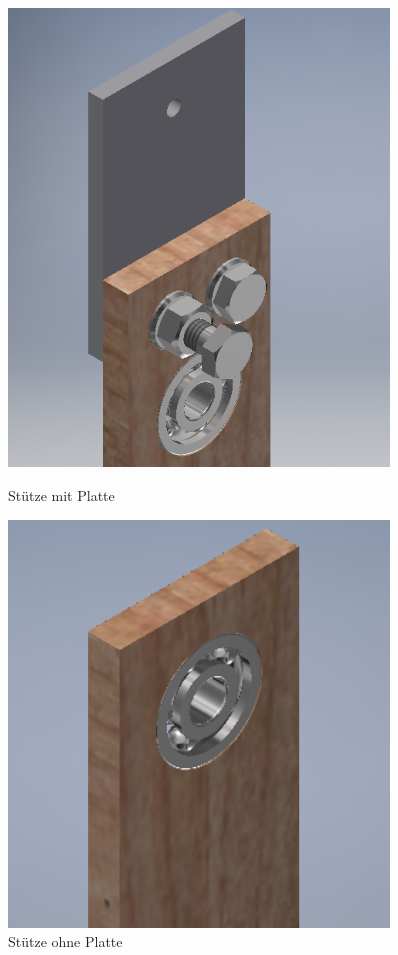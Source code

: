 \begin{figure}[H]
  \begin{minipage}[hbt]{0.45\textwidth}
    \includegraphics[width=0.9\textwidth]{Bilder/Inventor/Foerderband_mit_Platte}
 	\caption{Stütze mit Platte}
  	\label{Stuetz_Platte}
  \end{minipage}
\hspace{.03\linewidth}
  \begin{minipage}[hbt]{0.45\textwidth}
    \includegraphics[width=0.9\textwidth]{Bilder/Inventor/Foerderband_ohne_Platte}
  	\caption{Stütze ohne Platte}
  	\label{Stuetz_ohne_Platte}
  \end{minipage}
\end{figure}

